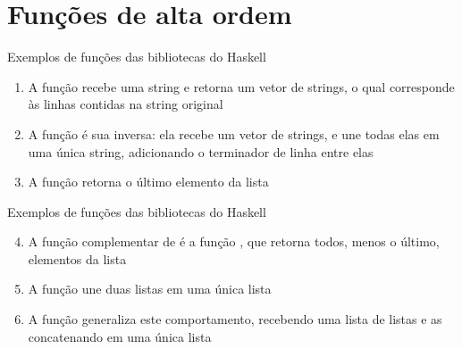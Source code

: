 \section{Funções de alta ordem}

\begin{frame}[fragile]{Exemplos de funções das bibliotecas do Haskell}

    \begin{enumerate}
        \item A função  recebe uma string e retorna um vetor de strings,
            o qual corresponde às linhas contidas na string original
        \item A função  é sua inversa: ela recebe um vetor de strings,
            e une todas elas em uma única string, adicionando o terminador de linha
            entre elas

        \item A função  retorna o último elemento da lista

    \end{enumerate}

\end{frame}

\begin{frame}[fragile]{Exemplos de funções das bibliotecas do Haskell}

    \begin{enumerate}
        \setcounter{enumi}{3}
        \item A função complementar de  é a função ,
            que retorna todos, menos o último, elementos da lista


        \item A função  une duas listas em uma única lista


        \item A função  generaliza este comportamento, recebendo uma lista
            de listas e as concatenando em uma única lista

    \end{enumerate}

\end{frame}

